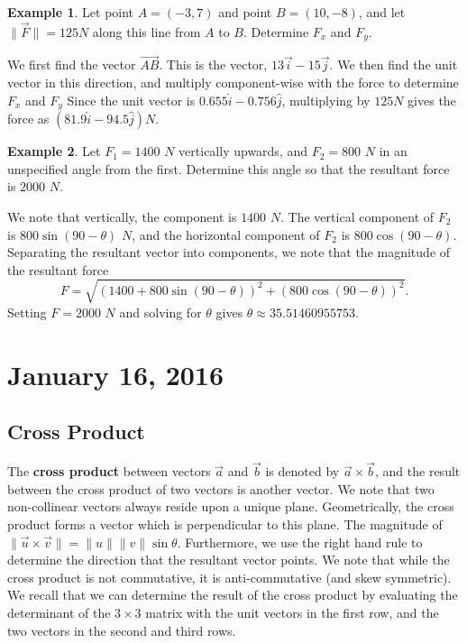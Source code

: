 \documentclass[11pt]{article}
\theoremstyle{plain} %
\theoremstyle{definition}
\theoremstyle{example}
\newtheorem*{example}{Example}
\theoremstyle{remark}
\begin{document}
\begin{example}
Let point $A = (-3, 7)$ and point $B = (10, -8)$, and let $\|\vec{F}\| = 125 N$  along this line from $A$ to $B$. Determine $F_x$ and $F_y$.
\end{example}

We first find the vector $\overrightarrow{AB}$. This is the vector, $13 \vec{i} -15\vec{j}$. We then find the unit vector in this direction, and multiply component-wise with the force to determine $F_x$ and $F_y$ Since the unit vector is $0.655\hat{i} -0.756\hat{j}$, multiplying by $125N$ gives the force as $\left(81.9\hat{i} -94.5\hat{j}\right) N$. 


\begin{example}
Let $F_1 = 1400$ $N$ vertically upwards, and $F_2 = 800$ $N$ in an unspecified angle from the first. Determine this angle so that the resultant force is $2000$ $N$. 
\end{example}

We note that vertically, the component is $1400$ $N$. The vertical component of $F_2$ is $800\sin(90-\theta)$ $N$, and the horizontal component of $F_2 $ is $800\cos(90-\theta)$. Separating the resultant vector into components, we note that the magnitude of the resultant force $$F = \sqrt{\left(1400+800\sin(90-\theta)\right)^2 + \left(800\cos(90-\theta)\right)^2}.$$
Setting $F = 2000$ $N$ and solving for $\theta$ gives $\theta \approx  35.51460955753.$

\section{January 16, 2016}
\subsection{Cross Product}

The \textbf{cross product} between vectors $\vec{a}$ and $\vec{b}$ is denoted by $\vec{a}\times\vec{b}$, and the result between the cross product of two vectors is another vector. We note that two non-collinear vectors always reside upon a unique plane. Geometrically, the cross product forms a vector which is perpendicular to this plane. The magnitude of $\|\vec{u} \times\vec{v}\| = \|u\| \|v\| \sin\theta$. Furthermore, we use the right hand rule to determine the direction that the resultant vector points. We note that while the cross product is not commutative, it is anti-commutative (and skew symmetric). We recall that we can determine the result of the cross product by evaluating the determinant of the $3\times3$ matrix with the unit vectors in the first row, and the two vectors in the second and third rows. 
\end{document}

